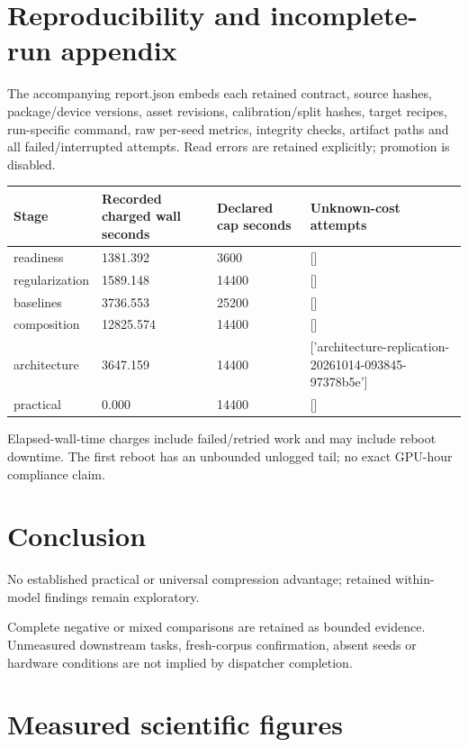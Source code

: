 \documentclass[10pt]{article}
\begin{document}
\section{Reproducibility and incomplete-run appendix}

The accompanying report.json embeds each retained contract, source hashes, package/device versions, asset revisions, calibration/split hashes, target recipes, run-specific command, raw per-seed metrics, integrity checks, artifact paths and all failed/interrupted attempts. Read errors are retained explicitly; promotion is disabled.

{\scriptsize\setlength{\tabcolsep}{2pt}
\begin{longtable}{p{}p{}p{}p{}}
Stage & Recorded charged wall seconds & Declared cap seconds & Unknown-cost attempts \\
\hline\endhead
readiness & 1381.392 & 3600 & [] \\
regularization & 1589.148 & 14400 & [] \\
baselines & 3736.553 & 25200 & [] \\
composition & 12825.574 & 14400 & [] \\
architecture & 3647.159 & 14400 & ['architecture-replication-20261014-093845-97378b5e'] \\
practical & 0.000 & 14400 & [] \\
\end{longtable}}

Elapsed-wall-time charges include failed/retried work and may include reboot downtime. The first reboot has an unbounded unlogged tail; no exact GPU-hour compliance claim.

\section{Conclusion}

No established practical or universal compression advantage; retained within-model findings remain exploratory.

Complete negative or mixed comparisons are retained as bounded evidence. Unmeasured downstream tasks, fresh-corpus confirmation, absent seeds or hardware conditions are not implied by dispatcher completion.

\section{Measured scientific figures}
\end{document}
